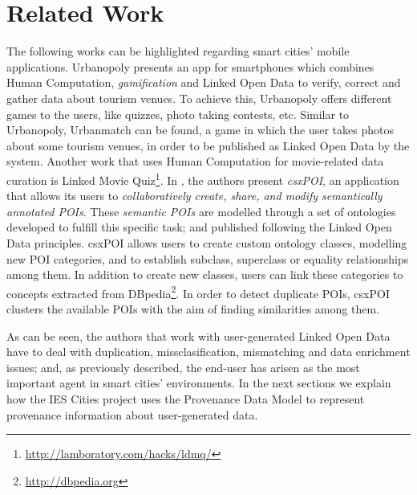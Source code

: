 \section{Related Work}
\label{sec:state_of_the_art}

The following works can be highlighted regarding smart cities' mobile applications. Urbanopoly \cite{celino_urbanopoly_2012} presents an app for smartphones which combines Human Computation, \textit{gamification} and Linked Open Data to verify, correct and gather data about tourism venues. To achieve this, Urbanopoly offers different games to the users, like quizzes, photo taking contests, etc. Similar to Urbanopoly, Urbanmatch \cite{celino_urbanmatch_2012} can be found, a game in which the user takes photos about some tourism venues, in order to be published as Linked Open Data by the system. Another work that uses Human Computation for movie-related data curation is Linked Movie Quiz\footnote{\url{http://lamboratory.com/hacks/ldmq/}}. In \cite{braun_collaborative_2007}, the authors present \textit{csxPOI}, an application that allows its users to \textit{collaboratively create, share, and modify semantically annotated POIs}. These \textit{semantic POIs} are modelled through a set of ontologies developed to fulfill this specific task; and published following the Linked Open Data principles. csxPOI allows users to create custom ontology classes, modelling new POI categories, and to establish subclass, superclass or equality relationships among them. In addition to create new classes, users can link these categories to concepts extracted from DBpedia\footnote{\url{http://dbpedia.org}}. In order to detect duplicate POIs, csxPOI clusters the available POIs with the aim of finding similarities among them.

As can be seen, the authors that work with user-generated Linked Open Data have to deal with duplication, missclasification, mismatching and data enrichment issues; and, as previously described, the end-user has arisen as the most important agent in smart cities' environments. In the next sections we explain how the IES Cities project uses the Provenance Data Model to represent provenance information about user-generated data.
